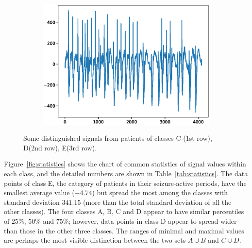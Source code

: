 \documentclass[12pt]{article}
\begin{document}
\begin{figure}
\begin{subfigure}{.25\textwidth}
\end{subfigure}%
\begin{subfigure}{.25\textwidth}
  \centering
  \includegraphics[width=.8\linewidth]{figures/signals/E/S084.eps}
\end{subfigure}
\caption{Some distinguished signals from patients of classes C (1st row), D(2nd row), E(3rd row).}
\label{fig:odd_signals}
\end{figure}

Figure~\ref{fig:statistics} shows the chart of common statistics of signal values within each class, and the detailed numbers are shown in Table~\ref{tab:statistics}. The data points of class E, the category of patients in their seizure-active periods, have the smallest average value ($-4.74$) but spread the most among the classes with standard deviation $341.15$ (more than the total standard deviation of all the other classes). The four classes A, B, C and D appear to have similar percentiles of $25\%$, $50\%$ and $75\%$; however, data points in class D appear to spread wider than those in the other three classes. The ranges of minimal and maximal values are perhaps the most visible distinction between the two sets $A \cup B$ and $C \cup D$.
\end{document}
